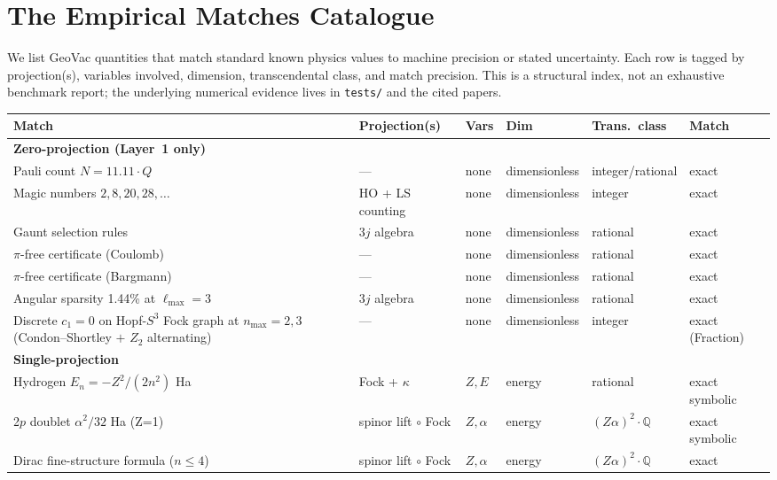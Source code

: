 \documentclass[11pt]{article}
\begin{document}
\section{The Empirical Matches Catalogue}
\label{sec:catalog}

We list GeoVac quantities that match standard known physics values
to machine precision or stated uncertainty.  Each row is tagged by
projection(s), variables involved, dimension, transcendental class,
and match precision.  This is a structural index, not an exhaustive
benchmark report; the underlying numerical evidence lives in
\texttt{tests/} and the cited papers.

\begin{longtable}{p{3.5cm} p{2.8cm} p{1.3cm} p{2.2cm} p{1.8cm} p{1.4cm}}
\toprule
Match & Projection(s) & Vars & Dim & Trans.\ class & Match \\
\midrule
\endhead
\textbf{Zero-projection (Layer~1 only)} & & & & & \\
Pauli count $N = 11.11{\cdot}Q$ & --- & none & dimensionless &
integer/rational & exact \\
Magic numbers $2,8,20,28,\ldots$ & HO + LS counting & none &
dimensionless & integer & exact \\
Gaunt selection rules & 3$j$ algebra & none & dimensionless &
rational & exact \\
$\pi$-free certificate (Coulomb) & --- & none & dimensionless &
rational & exact \\
$\pi$-free certificate (Bargmann) & --- & none & dimensionless &
rational & exact \\
Angular sparsity 1.44\% at $\ell_\text{max}=3$ & 3$j$ algebra &
none & dimensionless & rational & exact \\
Discrete $c_1 = 0$ on Hopf-$S^3$ Fock graph at $n_\text{max} = 2, 3$
(Condon--Shortley $+$ $Z_2$ alternating) & --- &
none & dimensionless & integer & exact (Fraction) \\
\midrule
\textbf{Single-projection} & & & & & \\
Hydrogen $E_n = -Z^2/(2n^2)$ Ha & Fock + $\kappa$ & $Z, E$ &
energy & rational & exact symbolic \\
2$p$ doublet $\alpha^2/32$ Ha (Z=1) & spinor lift $\circ$ Fock &
$Z, \alpha$ & energy & $(Z\alpha)^2{\cdot}\mathbb{Q}$ & exact symbolic \\
Dirac fine-structure formula ($n\le 4$) & spinor lift $\circ$ Fock &
$Z, \alpha$ & energy & $(Z\alpha)^2{\cdot}\mathbb{Q}$ & exact \\

\end{longtable}
\end{document}
